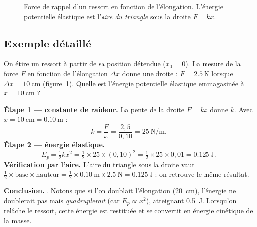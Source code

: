 \documentclass[11pt,a4paper]{article}
\begin{document}
\begin{figure}[h]
\centering
{}
\caption{Force de rappel d'un ressort en fonction de l'élongation. L'énergie potentielle élastique
est l'\emph{aire du triangle} sous la droite $F=kx$.}
\label{fig:hooke}
\end{figure}

\subsection{Exemple détaillé}

\begin{exemple}
On étire un ressort à partir de sa position détendue ($x_0=0$). La mesure de la force $F$ en fonction
de l'élongation $\Delta x$ donne une droite : $F=\SI{2,5}{\newton}$ lorsque $\Delta x=\SI{10}{\centi\metre}$
(figure~\ref{fig:hooke}). Quelle est l'énergie potentielle élastique emmagasinée à $x=\SI{10}{\centi\metre}$ ?

\smallskip
\textbf{Étape 1 — constante de raideur.} La pente de la droite $F=kx$ donne $k$. Avec
$x=\SI{10}{\centi\metre}=\SI{0,10}{\metre}$ :
\[
k=\frac{F}{x}=\frac{2{,}5}{0{,}10}=\SI{25}{\newton\per\metre}.
\]
\textbf{Étape 2 — énergie élastique.}
\[
E_p=\tfrac12 k x^2=\tfrac12\times25\times(0{,}10)^2=\tfrac12\times25\times0{,}01=\SI{0,125}{\joule}.
\]
\textbf{Vérification par l'aire.} L'aire du triangle sous la droite vaut
$\tfrac12\times\text{base}\times\text{hauteur}=\tfrac12\times\SI{0,10}{\metre}\times\SI{2,5}{\newton}=\SI{0,125}{\joule}$ :
on retrouve le même résultat.

\textbf{Conclusion.} . Notons que si l'on doublait l'élongation
(\SI{20}{\centi\metre}), l'énergie ne doublerait pas mais \emph{quadruplerait} (car $E_p\propto x^2$),
atteignant \SI{0,5}{\joule}. Lorsqu'on relâche le ressort, cette énergie est restituée et se convertit
en énergie cinétique de la masse.
\end{exemple}
\end{document}
